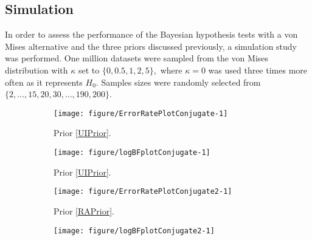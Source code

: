 \subsection{Simulation}
\label{ssub:Simulation}

In order to assess the performance of the Bayesian hypothesis tests with a von Mises alternative and the three priors discussed previously, a simulation study was performed.  One million datasets were sampled from the von Mises distribution with \( \kappa \) set to  \( \{ 0, 0.5, 1, 2, 5 \}, \) where \( \kappa = 0 \) was used three times more often as it represents \( H_0.\) Samples sizes were randomly selected from \( \{ 2, \dots, 15, 20, 30, \dots, 190, 200 \} \).



\begin{figure}
  \begin{subfigure}[t]{0.5\linewidth}
    \centering
\begin{knitrout}
\color{fgcolor}
\texttt{[image: figure/ErrorRatePlotConjugate-1]} 

\end{knitrout}
    \caption{Prior \ref{UIPrior}.}\label{fig:ErrorRatePlotConjugate}
  \end{subfigure}%
  \begin{subfigure}[t]{0.5\linewidth}
   \centering
\begin{knitrout}
\color{fgcolor}
\texttt{[image: figure/logBFplotConjugate-1]} 

\end{knitrout}
    \caption{Prior \ref{UIPrior}.}\label{fig:logBFplotConjugate}
  \end{subfigure}
  \begin{subfigure}[t]{0.5\linewidth}
    \centering
\begin{knitrout}
\color{fgcolor}
\texttt{[image: figure/ErrorRatePlotConjugate2-1]} 

\end{knitrout}
   \caption{Prior \ref{RAPrior}.}\label{fig:ErrorRatePlotConjugate2}
  \end{subfigure}%
  \begin{subfigure}[t]{0.5\linewidth}
   \centering
\begin{knitrout}
\color{fgcolor}
\texttt{[image: figure/logBFplotConjugate2-1]} 


\end{knitrout}
\end{subfigure}
\end{figure}

